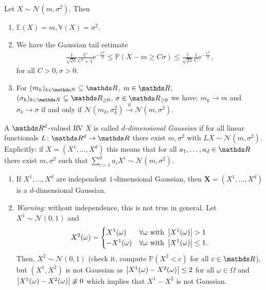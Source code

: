 \begin{prop}
Let $X\sim \mathcal{N}(m,\sigma^2)$. Then
\begin{enumerate}[label=(\alph*)]
\item $\mathds{E}(X)=m, \mathds{V}(X)=\sigma^2$.
\item We have the \glqq Gaussian tail estimate\grqq
\begin{align*}
\frac{1}{\sqrt{2\pi}} \frac{C}{C^2+1}\mathrm{e}^{-\frac{C^2}{2}}\leq \mathds{P}(X-m\geq C \sigma)\leq \frac{1}{\sqrt{2\pi}} \frac{1}{C}\mathrm{e}^{-\frac{C^2}{2}},
\end{align*}
for all $C>0,\sigma>0$.
\item For $(m_k)_{k\in \N}\subseteq \R$, $m\in \R$, $(\sigma_k)_{k\in \N}\subseteq \R_{\geq 0}$, $\sigma\in \R_{\geq 0}$ we have:
$m_k\to m$ and $\sigma_k\to \sigma$ if and only if $\mathcal{N}(m_k,\sigma_k^2)\overset{\text{d}}{\to} \mathcal{N}(m,\sigma^2)$.
\end{enumerate}
\end{prop}

\begin{defi}
A $\Rd$-valued RV $X$ is called \emph{$d$-dimensional Gaussian} if for all linear functionals $L\colon \Rd\to \R$ there exist $m,\sigma^2$ with $LX\sim \mathcal{N}(m,\sigma^2)$.
Explicitly: if $X=(X^1,\dots,X^d)$ this means that for all $a_1,\dots,a_d \in \R$ there exist $m,\sigma^2$ such that $\sum_{i=1}^d a_i X^i \sim \mathcal{N}(m,\sigma^2)$.
\end{defi}

\begin{bsp}
\begin{enumerate}[label=\alph*)]
\item If $X^1,\dots,X^d$ are independent $1$-dimensional Gaussian, then 
$\textbf{X}=(X^1,\dots,X^d)$ is a $d$-dimensional Gaussian.
\item \emph{Warning:} without independence, this is not true in general.
Let $X^1\sim \mathcal{N}(0,1)$ and
\begin{align*}
X^2(\omega)=\begin{cases}
X^1(\omega)~~&\forall \omega \text{ with } \left\vert X^1(\omega)\right\vert>1\\
-X^1(\omega)&\forall \omega \text{ with } \left\vert X^1(\omega)\right\vert\leq 1.
\end{cases}
\end{align*}
Then, $X^2\sim \mathcal{N}(0,1)$ (check it, compute $\mathds{P}(X^2<c)$ for all $c\in \R$), but $(X^1,X^2)$ is not Gaussian as
$\left\vert X^1(\omega)-X^2(\omega)\right\vert\leq 2$ for all $\omega \in \Omega$ and
$\left\vert X^1(\omega)-X^2(\omega)\right\vert\not \equiv 0$ which implies that $X^1-X^2$ is not Gaussian.
\end{enumerate}
\end{bsp}

